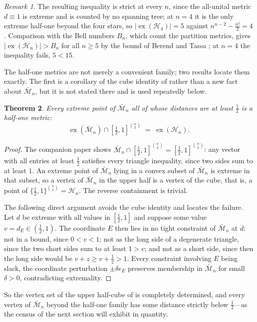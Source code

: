 \documentclass[11pt]{article}
\newtheorem{theorem}{Theorem}[section]
\theoremstyle{definition}
\theoremstyle{remark}
\newtheorem{remark}[theorem]{Remark}
\newcommand{\bM}{\bar{\mathcal{M}}}
\newcommand{\Ha}{\mathcal{H}}
\newcommand{\ex}{\operatorname{ex}}
\begin{document}
\begin{remark}
The resulting inequality is strict at every $n$, since the all-unital metric $d\equiv1$ is
extreme and is counted by no spanning tree; at $n=4$ it is the only extreme half-one beyond
the four stars, so $|\ex(\Ha_4)|=5$ against $n^{n-2}-\tfrac{n!}2=4$. Comparison with the
Bell numbers $B_n$, which count the partition metrics, gives $|\ex(\Ha_n)|>B_n$ for all
$n\geq5$ by the bound of Berend and Tassa \cite{Berend10};
at $n=4$ the inequality fails, $5<15$.
\end{remark}

The half-one metrics are not merely a convenient family; two results locate them exactly.
The first is a corollary of the cube identity of \cite{FK-cone} rather than a new fact about
$\bM_n$, but it is not stated there and is used repeatedly below.

\begin{theorem}\label{thm:upperhalf}
Every extreme point of $\bM_n$ all of whose distances are at least $\tfrac12$ is a half-one
metric:
\[
\ex(\bM_n)\cap[\tfrac12,1]^{\binom n2}\;=\;\ex(\Ha_n).
\]
\end{theorem}

\begin{proof}
The companion paper shows $\bM_n\cap[\tfrac12,1]^{\binom n2}=[\tfrac12,1]^{\binom n2}$: any
vector with all entries at least $\tfrac12$ satisfies every triangle inequality, since two
sides sum to at least $1$. An extreme point of $\bM_n$ lying in a convex subset of $\bM_n$
is extreme in that subset, so a vertex of $\bM_n$ in the upper half is a vertex of the cube,
that is, a point of $\{\tfrac12,1\}^{\binom n2}=\Ha_n$. The reverse containment is trivial.

The following direct argument avoids the cube identity and locates the failure. Let $d$ be
extreme with all values in $[\tfrac12,1]$ and suppose some value $v=d_E\in(\tfrac12,1)$. The
coordinate $E$ then lies in no tight constraint of $\bM_n$ at $d$: not in a bound, since
$0<v<1$; not as the long side of a degenerate triangle, since the two short sides sum to at
least $1>v$; and not as a short side, since then the long side would be
$v+z\geq v+\tfrac12>1$. Every constraint involving $E$ being slack, the coordinate
perturbation $\pm\delta e_E$ preserves membership in $\bM_n$ for small $\delta>0$,
contradicting extremality.
\end{proof}

So the vertex set of the upper half-cube of \cite{FK-cone} is completely determined, and
every vertex of $\bM_n$ beyond the half-one family has some distance strictly below
$\tfrac12$---as the census of the next section will exhibit in quantity.
\end{document}
